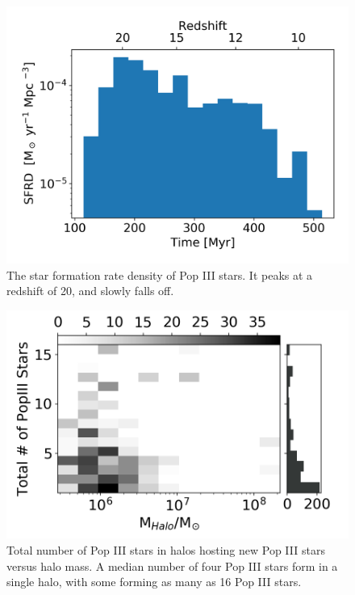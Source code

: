 \documentclass[a4paper,fleqn,usenatbib]{mnras}
\begin{document}
\begin{figure}
	\includegraphics[width=\columnwidth]{images/pop3_SFR_bar.png}
    \caption{The star formation rate density of Pop III stars. It peaks at a redshift of 20, and slowly falls off.}
    \label{fig:pop3_SFR_bar}
\end{figure}

\begin{figure}
	\includegraphics[width=\columnwidth]{images/totnump3_halomass_sidehist.png}
    \caption{Total number of Pop III stars in halos hosting new Pop III stars versus halo mass. A median number of four Pop III stars form in a single halo, with some forming as many as 16 Pop III stars.}
    \label{fig:totnump3_halomass_sidehist}
\end{figure}
\end{document}
